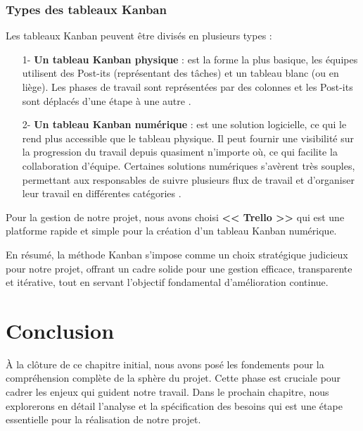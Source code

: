     \subsubsection{Types des tableaux Kanban}
    \par Les tableaux Kanban peuvent être divisés en plusieurs types :
    \begin{enumerate}
        \item[1-]\textbf{Un tableau Kanban physique }: est la forme la plus basique, les équipes utilisent des Post-its (représentant des tâches) et un tableau blanc (ou en liège). 
        Les phases de travail sont représentées par des colonnes et les Post-its sont déplacés d'une étape à une autre \cite{tableau}.
        \item[2-]\textbf{Un tableau Kanban numérique }: est une solution logicielle, ce qui le rend plus accessible que le tableau physique. Il peut fournir une visibilité sur la progression du travail depuis quasiment 
        n'importe où, ce qui facilite la collaboration d'équipe. 
        Certaines solutions numériques s'avèrent très souples, permettant aux responsables de suivre plusieurs flux de travail et d'organiser leur travail en différentes catégories \cite{tableau}.
    \end{enumerate}
\par Pour la gestion de notre projet, nous avons choisi \textbf{<< Trello >>} qui est une platforme rapide et simple pour la création d'un tableau Kanban numérique.


\par En résumé, la méthode Kanban s'impose comme un choix stratégique judicieux pour notre projet, offrant un cadre solide pour une gestion efficace, transparente et itérative, tout en servant l'objectif fondamental d'amélioration continue.

\section*{Conclusion}
   À la clôture de ce chapitre initial, nous avons posé les fondements pour la compréhension complète de la sphère du projet.
Cette phase est cruciale pour cadrer les enjeux qui guident notre travail. 
Dans le prochain chapitre, nous explorerons en détail l'analyse et la spécification des besoins qui est une étape essentielle pour la réalisation de notre projet.